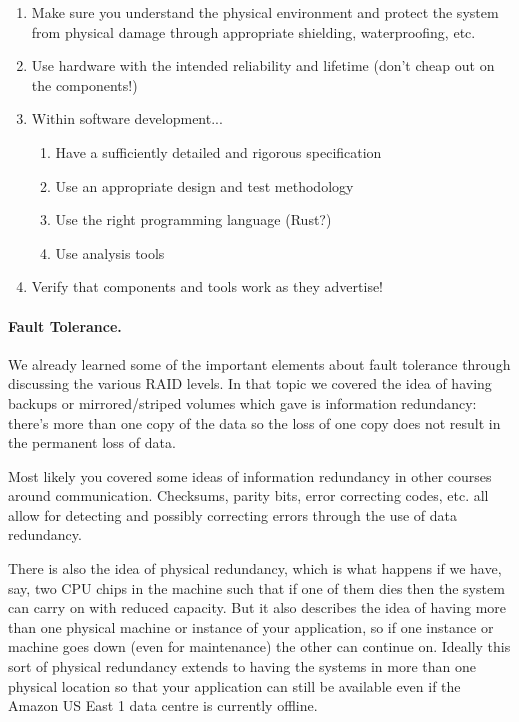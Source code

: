 \begin{enumerate}
	\item Make sure you understand the physical environment and protect the system from physical damage through appropriate shielding, waterproofing, etc.
	\item Use hardware with the intended reliability and lifetime (don't cheap out on the components!)
	\item Within software development...
		\begin{enumerate}
			\item Have a sufficiently detailed and rigorous specification
			\item Use an appropriate design and test methodology
			\item Use the right programming language (Rust?)
			\item Use analysis tools
		\end{enumerate}
	\item Verify that components and tools work as they advertise!
\end{enumerate}

\paragraph{Fault Tolerance.}
We already learned some of the important elements about fault tolerance through discussing the various RAID levels. In that topic we covered the idea of having backups or mirrored/striped volumes which gave is information redundancy: there's more than one copy of the data so the loss of one copy does not result in the permanent loss of data. 

Most likely you covered some ideas of information redundancy in other courses around communication. Checksums, parity bits, error correcting codes, etc. all allow for detecting and possibly correcting errors through the use of data redundancy.

There is also the idea of physical redundancy, which is what happens if we have, say, two CPU chips in the machine such that if one of them dies then the system can carry on with reduced capacity. But it also describes the idea of having more than one physical machine or instance of your application, so if one instance or machine goes down (even for maintenance) the other can continue on. Ideally this sort of physical redundancy extends to having the systems in more than one physical location so that your application can still be available even if the Amazon US East 1 data centre is currently offline.

